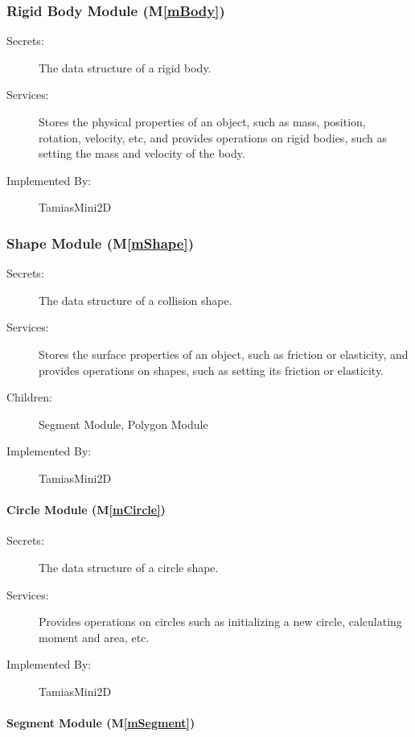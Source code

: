 \documentclass[12pt]{article}
\newcommand{\mref}[1]{M\ref{#1}}
\begin{document}
\subsubsection{Rigid Body Module (\mref{mBody})}

\begin{description}
\item[Secrets:]The data structure of a rigid body.
\item[Services:]Stores the physical properties of an object, such as mass, 
position, rotation, velocity, etc, and provides operations on rigid bodies, such as setting the mass and velocity of the body.

\item[Implemented By:] TamiasMini2D
\end{description}

\subsubsection{Shape Module (\mref{mShape})}

\begin{description}
\item[Secrets:]The data structure of a collision shape.
\item[Services:]Stores the surface properties of an object, such as friction or elasticity, and provides operations on shapes, such as setting its friction or elasticity.
\item[Children:] Segment Module, Polygon Module
\item[Implemented By:] TamiasMini2D
\end{description}

\paragraph{Circle Module (\mref{mCircle})}

\begin{description}
	\item[Secrets:] The data structure of a circle shape.
	\item[Services:] Provides operations on circles such as initializing a new circle, calculating moment and area, etc.
	\item[Implemented By:] TamiasMini2D
\end{description}

\paragraph{Segment Module (\mref{mSegment})}
\end{document}
